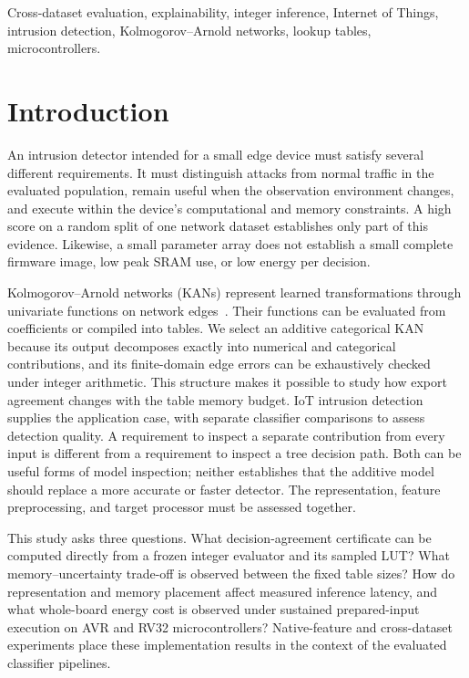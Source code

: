 \documentclass{ieeeaccess}
\begin{document}
\begin{keywords}
Cross-dataset evaluation, explainability, integer inference, Internet of Things, intrusion detection, Kolmogorov--Arnold networks, lookup tables, microcontrollers.
\end{keywords}
\titlepgskip=-21pt
\maketitle

\section{Introduction}
An intrusion detector intended for a small edge device must satisfy several different requirements. It must distinguish attacks from normal traffic in the evaluated population, remain useful when the observation environment changes, and execute within the device's computational and memory constraints. A high score on a random split of one network dataset establishes only part of this evidence. Likewise, a small parameter array does not establish a small complete firmware image, low peak SRAM use, or low energy per decision.

Kolmogorov--Arnold networks (KANs) represent learned transformations through univariate functions on network edges~\cite{liu2024kan}. Their functions can be evaluated from coefficients or compiled into tables. We select an additive categorical KAN because its output decomposes exactly into numerical and categorical contributions, and its finite-domain edge errors can be exhaustively checked under integer arithmetic. This structure makes it possible to study how export agreement changes with the table memory budget. IoT intrusion detection supplies the application case, with separate classifier comparisons to assess detection quality. A requirement to inspect a separate contribution from every input is different from a requirement to inspect a tree decision path. Both can be useful forms of model inspection; neither establishes that the additive model should replace a more accurate or faster detector. The representation, feature preprocessing, and target processor must be assessed together.

This study asks three questions. What decision-agreement certificate can be computed directly from a frozen integer evaluator and its sampled LUT? What memory--uncertainty trade-off is observed between the fixed table sizes? How do representation and memory placement affect measured inference latency, and what whole-board energy cost is observed under sustained prepared-input execution on AVR and RV32 microcontrollers? Native-feature and cross-dataset experiments place these implementation results in the context of the evaluated classifier pipelines.
\end{document}

